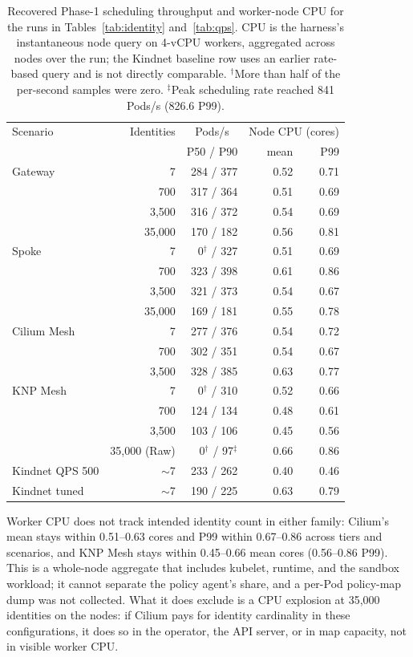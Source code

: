 \documentclass[letterpaper,twocolumn,10pt]{article}
\newcommand{\sys}{\textsc{KNP}}
\begin{document}
\begin{table}[t]
\centering
\small
\setlength{\tabcolsep}{3.5pt}
\begin{tabular}{lrrrr}
\toprule
Scenario & Identities & \multicolumn{1}{c}{Pods/s} & \multicolumn{2}{c}{Node CPU (cores)}\\
 & & P50 / P90 & mean & P99\\
\midrule
Gateway & 7 & 284 / 377 & 0.52 & 0.71\\
 & 700 & 317 / 364 & 0.51 & 0.69\\
 & 3,500 & 316 / 372 & 0.54 & 0.69\\
 & 35,000 & 170 / 182 & 0.56 & 0.81\\
\midrule
Spoke & 7 & 0$^{\dagger}$ / 327 & 0.51 & 0.69\\
 & 700 & 323 / 398 & 0.61 & 0.86\\
 & 3,500 & 321 / 373 & 0.54 & 0.67\\
 & 35,000 & 169 / 181 & 0.55 & 0.78\\
\midrule
Cilium Mesh & 7 & 277 / 376 & 0.54 & 0.72\\
 & 700 & 302 / 351 & 0.54 & 0.67\\
 & 3,500 & 328 / 385 & 0.63 & 0.77\\
\midrule
\sys{} Mesh & 7 & 0$^{\dagger}$ / 310 & 0.52 & 0.66\\
 & 700 & 124 / 134 & 0.48 & 0.61\\
 & 3,500 & 103 / 106 & 0.45 & 0.56\\
 & 35,000 (Raw) & 0$^{\dagger}$ / 97$^{\ddagger}$ & 0.66 & 0.86\\
\midrule
Kindnet QPS 500 & $\sim$7 & 233 / 262 & 0.40 & 0.46\\
Kindnet tuned & $\sim$7 & 190 / 225 & 0.63 & 0.79\\
\bottomrule
\end{tabular}
\caption{Recovered Phase-1 scheduling throughput and worker-node CPU
for the runs in Tables~\ref{tab:identity} and~\ref{tab:qps}. CPU is the
harness's instantaneous node query on 4-vCPU workers, aggregated across
nodes over the run; the Kindnet baseline row uses an earlier
rate-based query and is not directly comparable. $^{\dagger}$More than
half of the per-second samples were zero. $^{\ddagger}$Peak scheduling rate reached 841 Pods/s (826.6 P99).}
\label{tab:resources}
\end{table}

Worker CPU does not track intended identity count in either family:
Cilium's mean stays within 0.51--0.63 cores and P99 within 0.67--0.86
across tiers and scenarios, and \sys{} Mesh stays within 0.45--0.66 mean
cores (0.56--0.86 P99). This is a whole-node aggregate that includes kubelet,
runtime, and the sandbox workload; it cannot separate the policy agent's share,
and a per-Pod policy-map dump was not collected. What it does exclude
is a CPU explosion at 35,000 identities on the nodes: if Cilium pays
for identity cardinality in these configurations, it does so in the
operator, the API server, or in map capacity, not in visible worker CPU.
\end{document}
